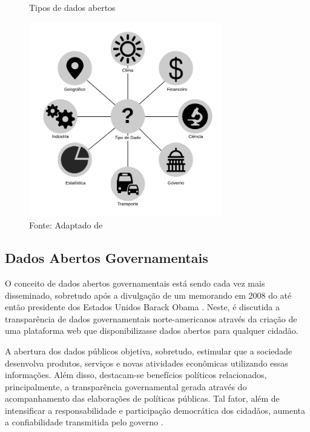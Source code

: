 \begin{figure}[!h]
   \centering
   \caption{Tipos de dados abertos}
   \includegraphics[width=0.75\textwidth]{figs/cap02_dados_abertos.pdf}
   \caption*{\footnotesize{Fonte: Adaptado de \cite{cap02_ref36}}}
   \label{fig:dadosabertos}
\end{figure}

\subsection{Dados Abertos Governamentais}

O conceito de dados abertos governamentais está sendo cada vez mais disseminado, sobretudo após a divulgação de um memorando em 2008 do até então presidente dos Estados Unidos Barack Obama \cite{cap02_ref27}. Neste, é discutida a transparência de dados governamentais norte-americanos através da criação de uma plataforma web \cite{cap02_ref28} que disponibilizasse dados abertos para qualquer cidadão.

A abertura dos dados públicos objetiva, sobretudo, estimular que a sociedade desenvolva produtos, serviços e novas atividades econômicas utilizando essas informações. Além disso, destacam-se benefícios políticos relacionados, principalmente, a transparência governamental gerada através do acompanhamento das elaborações de políticas públicas. Tal fator, além de intensificar a responsabilidade e participação democrática dos cidadãos, aumenta a confiabilidade transmitida pelo governo \cite{cap02_ref38}.

